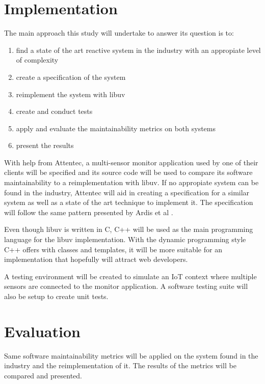 \section{Implementation}

The main approach this study will undertake to answer its question is to:

\begin{enumerate}
  \item find a state of the art reactive system in the industry with an
    appropiate level of complexity
  \item create a specification of the system
  \item reimplement the system with libuv
  \item create and conduct tests
  \item apply and evaluate the maintainability metrics on both systems
  \item present the results
\end{enumerate}

With help from Attentec, a multi-sensor monitor application used by one of
their clients will be specified and its source code will be used to compare its
software maintainability to a reimplementation with libuv. If no appropiate
system can be found in the industry, Attentec will aid in creating a
specification for a similar system as well as a state of the art technique to
implement it. The specification will follow the same pattern presented by Ardis
et al \cite{ardis1996framework}.

Even though libuv is written in C, C++ will be used as the main programming
language for the libuv implementation. With the dynamic programming style C++
offers with classes and templates, it will be more suitable for an
implementation that hopefully will attract web developers.

A testing environment will be created to simulate an IoT context where multiple
sensors are connected to the monitor application. A software testing suite will
also be setup to create unit tests.

\section{Evaluation}

Same software maintainability metrics will be applied on the system found in
the industry and the reimplementation of it. The results of the metrics will be
compared and presented.
